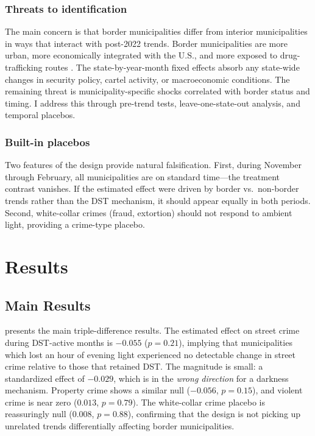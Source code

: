 \documentclass[12pt]{article}
\begin{document}
\subsubsection*{Threats to identification} The main concern is that border municipalities differ from interior municipalities in ways that interact with post-2022 trends. Border municipalities are more urban, more economically integrated with the U.S., and more exposed to drug-trafficking routes \citep{dell2015}. The state-by-year-month fixed effects absorb any state-wide changes in security policy, cartel activity, or macroeconomic conditions. The remaining threat is municipality-specific shocks correlated with border status and timing. I address this through pre-trend tests, leave-one-state-out analysis, and temporal placebos.

\subsubsection*{Built-in placebos} Two features of the design provide natural falsification. First, during November through February, all municipalities are on standard time---the treatment contrast vanishes. If the estimated effect were driven by border vs.\ non-border trends rather than the DST mechanism, it should appear equally in both periods. Second, white-collar crimes (fraud, extortion) should not respond to ambient light, providing a crime-type placebo.

\section{Results}

\subsection{Main Results}



 presents the main triple-difference results. The estimated effect on street crime during DST-active months is $-0.055$ ($p = 0.21$), implying that municipalities which lost an hour of evening light experienced no detectable change in street crime relative to those that retained DST. The magnitude is small: a standardized effect of $-0.029$, which is in the \textit{wrong direction} for a darkness mechanism. Property crime shows a similar null ($-0.056$, $p = 0.15$), and violent crime is near zero ($0.013$, $p = 0.79$). The white-collar crime placebo is reassuringly null ($0.008$, $p = 0.88$), confirming that the design is not picking up unrelated trends differentially affecting border municipalities.
\end{document}
